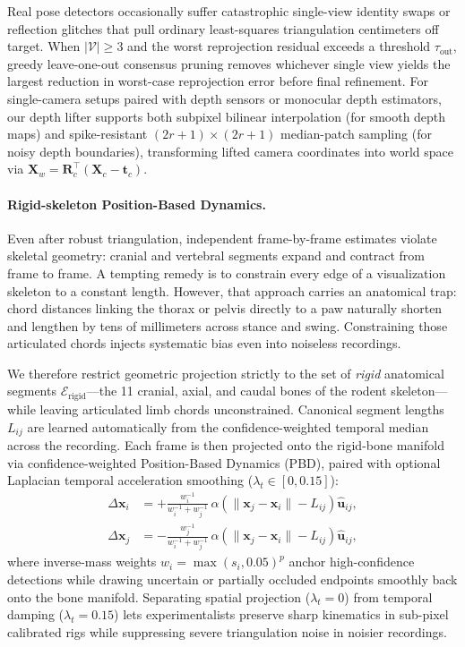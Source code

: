 \documentclass[10pt,twocolumn,letterpaper]{article}
\begin{document}
Real pose detectors occasionally suffer catastrophic single-view identity swaps or reflection glitches that pull ordinary least-squares triangulation centimeters off target. When $|\mathcal{V}| \ge 3$ and the worst reprojection residual exceeds a threshold $\tau_{\mathrm{out}}$, greedy leave-one-out consensus pruning removes whichever single view yields the largest reduction in worst-case reprojection error before final refinement. For single-camera setups paired with depth sensors or monocular depth estimators, our depth lifter supports both subpixel bilinear interpolation (for smooth depth maps) and spike-resistant $(2r+1)\times(2r+1)$ median-patch sampling (for noisy depth boundaries), transforming lifted camera coordinates into world space via $\mathbf{X}_w = \mathbf{R}_c^\top(\mathbf{X}_c - \mathbf{t}_c)$.

\paragraph{Rigid-skeleton Position-Based Dynamics.}
Even after robust triangulation, independent frame-by-frame estimates violate skeletal geometry: cranial and vertebral segments expand and contract from frame to frame. A tempting remedy is to constrain every edge of a visualization skeleton to a constant length. However, that approach carries an anatomical trap: chord distances linking the thorax or pelvis directly to a paw naturally shorten and lengthen by tens of millimeters across stance and swing. Constraining those articulated chords injects systematic bias even into noiseless recordings.

We therefore restrict geometric projection strictly to the set of \emph{rigid} anatomical segments $\mathcal{E}_{\mathrm{rigid}}$---the 11 cranial, axial, and caudal bones of the rodent skeleton---while leaving articulated limb chords unconstrained. Canonical segment lengths $L_{ij}$ are learned automatically from the confidence-weighted temporal median across the recording. Each frame is then projected onto the rigid-bone manifold via confidence-weighted Position-Based Dynamics (PBD), paired with optional Laplacian temporal acceleration smoothing ($\lambda_t \in [0, 0.15]$):
\begin{align}
  \Delta \mathbf{x}_i &= +\frac{w_i^{-1}}{w_i^{-1} + w_j^{-1}}\, \alpha \left(\|\mathbf{x}_j - \mathbf{x}_i\| - L_{ij}\right)\hat{\mathbf{u}}_{ij}, \\
  \Delta \mathbf{x}_j &= -\frac{w_j^{-1}}{w_i^{-1} + w_j^{-1}}\, \alpha \left(\|\mathbf{x}_j - \mathbf{x}_i\| - L_{ij}\right)\hat{\mathbf{u}}_{ij},
\end{align}
where inverse-mass weights $w_i = \max(s_i, 0.05)^p$ anchor high-confidence detections while drawing uncertain or partially occluded endpoints smoothly back onto the bone manifold. Separating spatial projection ($\lambda_t = 0$) from temporal damping ($\lambda_t = 0.15$) lets experimentalists preserve sharp kinematics in sub-pixel calibrated rigs while suppressing severe triangulation noise in noisier recordings.
\end{document}
